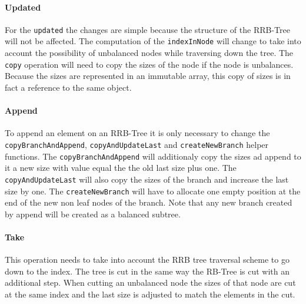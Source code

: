 
\paragraph{Updated}
For the \texttt{updated} the changes are simple because the structure of the RRB-Tree will not be affected. The computation of the \texttt{indexInNode} will change to take into account the possibility of unbalanced nodes while traversing down the tree. The \texttt{copy} operation will need to copy the sizes of the node if the node is unbalances. Because the sizes are represented in an immutable array, this copy of sizes is in fact a reference to the same object.

\paragraph{Append}
To append an element on an RRB-Tree it is only necessary to change the \texttt{copyBranchAndAppend},  \texttt{copyAndUpdateLast} and \texttt{createNewBranch} helper functions. The \texttt{copyBranchAndAppend} will additionaly copy the sizes ad append to it a new size with value equal the the old last size plus one. The \texttt{copyAndUpdateLast} will also copy the sizes of the branch and increase the last size by one. The \texttt{createNewBranch} will have to allocate one empty position at the end of the new non leaf nodes of the branch. Note that any new branch created by append will be created as a balanced subtree.



\paragraph{Take}
This operation needs to take into account the RRB tree traversal scheme to go down to the index. The tree is cut in the same way the RB-Tree is cut with an additional step. When cutting an unbalanced node the sizes of that node are cut at the same index and the last size is adjusted to match the elements in the cut. 



